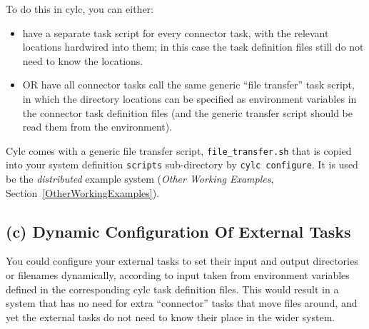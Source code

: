 \documentclass[11pt,a4paper]{article}
\begin{document}
To do this in cylc, you can either:

\begin{itemize}
    \item have a separate task script for every connector task, with the
        relevant locations hardwired into them; in this case the task
        definition files still do not need to know the locations.
    \item OR have all connector tasks call the same generic ``file
        transfer'' task script, in which the directory locations can be
        specified as environment variables in the connector task
        definition files (and the generic transfer script should be read
        them from the environment).
\end{itemize}

Cylc comes with a generic file transfer script, \lstinline=file_transfer.sh= that
is copied into your system definition \lstinline=scripts= sub-directory 
by \lstinline=cylc configure=. It is used be the {\em distributed}
example system ({\em Other Working Examples}, Section~\ref{OtherWorkingExamples}).

\subsection{(c) Dynamic Configuration Of External Tasks}

You could configure your external tasks to set their input and output
directories or filenames dynamically, according to input taken from
environment variables defined in the corresponding cylc task definition
files. This would result in a system that has no need for extra
``connector'' tasks that move files around, and yet the external tasks
do not need to know their place in the wider system.

%
\end{document}

